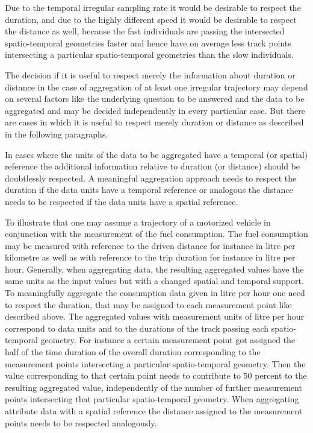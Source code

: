 \documentclass[12pt, oneside, a4paper]{scrbook}
\begin{document}
Due to the temporal irregular sampling rate it would be desirable to respect the duration, and due to the highly different speed it would be desirable to respect the distance as well, because the fast individuals are passing the intersected spatio-temporal geometries faster and hence have on average less track points intersecting a particular spatio-temporal geometries than the slow individuals.
\par\medskip
The decision if it is useful to respect merely the information about duration or distance in the case of aggregation of at least one irregular trajectory may depend on several factors like the underlying question to be answered and the data to be aggregated and may be decided independently in every particular case.
But there are cases in which it is useful to respect merely duration or distance as described in the following paragraphs.
\par\medskip




In cases where the units of the data to be aggregated have a temporal (or spatial) reference the additional information relative to duration (or distance) should be doubtlessly respected. A meaningful aggregation approach needs to respect the duration if the data units have a temporal reference or analogous the distance needs to be respected if the data units have a spatial reference.
\par\medskip
To illustrate that one may assume a trajectory of a motorized vehicle in conjunction with the measurement of the fuel consumption. 
The fuel consumption may be measured with reference to the driven distance for instance in litre per kilometre as well as with reference to the trip duration for instance in litre per hour.
Generally, when aggregating data, the resulting aggregated values have the same units as the input values but with a changed spatial and temporal support.
To meaningfully aggregate the consumption data given in litre per hour one need to respect the duration, that may be assigned to each measurement point like described above.
The aggregated values with measurement units of litre per hour correspond to data units and to the durations of the track passing each spatio-temporal geometry. 
For instance a certain measurement point got assigned the half of the time duration of the overall duration corresponding to the measurement points intersecting a particular spatio-temporal geometry. Then the value corresponding to that certain point needs to contribute to 50 percent to the resulting aggregated value, independently of the number of further measurement points intersecting that particular spatio-temporal geometry.
When aggregating attribute data with a spatial reference the distance assigned to the measurement points  needs to be respected analogously.
\par\medskip
\end{document}
